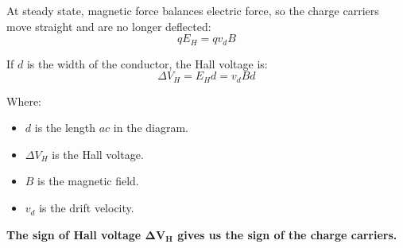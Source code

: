 \documentclass[11pt]{article}
\begin{document}
At steady state, magnetic force balances electric force, so the charge carriers move straight and are no longer deflected:
\[qE_H = qv_d B\]

If \(d\) is the width of the conductor, the Hall voltage is:
\[\Delta V_H = E_H d = v_d Bd\]

Where:
\begin{itemize}
\item \(d\) is the length \(ac\) in the diagram.
\item \(\Delta V_H\) is the Hall voltage.
\item \(B\) is the magnetic field.
\item \(v_d\) is the drift velocity.
\end{itemize}

\textbf{The sign of Hall voltage \(\boldsymbol{\Delta V_H}\) gives us the sign of the charge carriers.}
\end{document}
